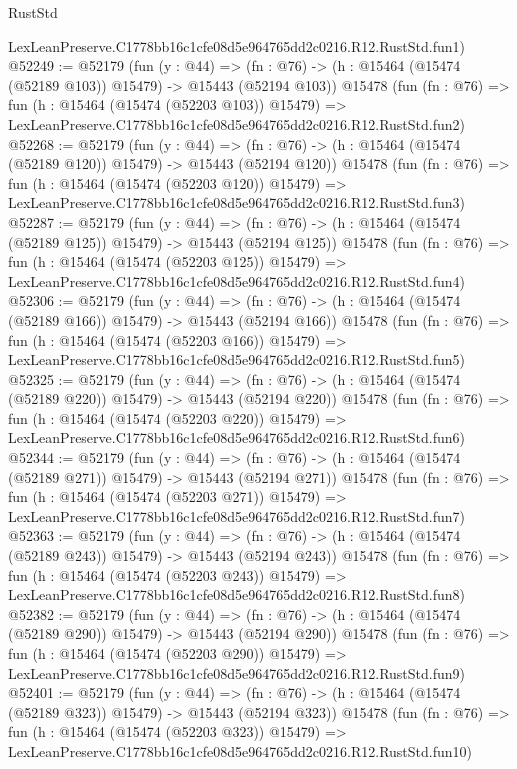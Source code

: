 \begin{lexlean}{RustStd}
\begin{coremodule}
    LexLeanPreserve.C1778bb16c1cfe08d5e964765dd2c0216.R12.RustStd.fun1)
@52249 := @52179
    (fun (y : @44) =>
    (fn : @76) -> (h : @15464 (@15474 (@52189 @103)) @15479) -> @15443 (@52194 @103))
    @15478
    (fun (fn : @76) =>
    fun (h : @15464 (@15474 (@52203 @103)) @15479) =>
    LexLeanPreserve.C1778bb16c1cfe08d5e964765dd2c0216.R12.RustStd.fun2)
@52268 := @52179
    (fun (y : @44) =>
    (fn : @76) -> (h : @15464 (@15474 (@52189 @120)) @15479) -> @15443 (@52194 @120))
    @15478
    (fun (fn : @76) =>
    fun (h : @15464 (@15474 (@52203 @120)) @15479) =>
    LexLeanPreserve.C1778bb16c1cfe08d5e964765dd2c0216.R12.RustStd.fun3)
@52287 := @52179
    (fun (y : @44) =>
    (fn : @76) -> (h : @15464 (@15474 (@52189 @125)) @15479) -> @15443 (@52194 @125))
    @15478
    (fun (fn : @76) =>
    fun (h : @15464 (@15474 (@52203 @125)) @15479) =>
    LexLeanPreserve.C1778bb16c1cfe08d5e964765dd2c0216.R12.RustStd.fun4)
@52306 := @52179
    (fun (y : @44) =>
    (fn : @76) -> (h : @15464 (@15474 (@52189 @166)) @15479) -> @15443 (@52194 @166))
    @15478
    (fun (fn : @76) =>
    fun (h : @15464 (@15474 (@52203 @166)) @15479) =>
    LexLeanPreserve.C1778bb16c1cfe08d5e964765dd2c0216.R12.RustStd.fun5)
@52325 := @52179
    (fun (y : @44) =>
    (fn : @76) -> (h : @15464 (@15474 (@52189 @220)) @15479) -> @15443 (@52194 @220))
    @15478
    (fun (fn : @76) =>
    fun (h : @15464 (@15474 (@52203 @220)) @15479) =>
    LexLeanPreserve.C1778bb16c1cfe08d5e964765dd2c0216.R12.RustStd.fun6)
@52344 := @52179
    (fun (y : @44) =>
    (fn : @76) -> (h : @15464 (@15474 (@52189 @271)) @15479) -> @15443 (@52194 @271))
    @15478
    (fun (fn : @76) =>
    fun (h : @15464 (@15474 (@52203 @271)) @15479) =>
    LexLeanPreserve.C1778bb16c1cfe08d5e964765dd2c0216.R12.RustStd.fun7)
@52363 := @52179
    (fun (y : @44) =>
    (fn : @76) -> (h : @15464 (@15474 (@52189 @243)) @15479) -> @15443 (@52194 @243))
    @15478
    (fun (fn : @76) =>
    fun (h : @15464 (@15474 (@52203 @243)) @15479) =>
    LexLeanPreserve.C1778bb16c1cfe08d5e964765dd2c0216.R12.RustStd.fun8)
@52382 := @52179
    (fun (y : @44) =>
    (fn : @76) -> (h : @15464 (@15474 (@52189 @290)) @15479) -> @15443 (@52194 @290))
    @15478
    (fun (fn : @76) =>
    fun (h : @15464 (@15474 (@52203 @290)) @15479) =>
    LexLeanPreserve.C1778bb16c1cfe08d5e964765dd2c0216.R12.RustStd.fun9)
@52401 := @52179
    (fun (y : @44) =>
    (fn : @76) -> (h : @15464 (@15474 (@52189 @323)) @15479) -> @15443 (@52194 @323))
    @15478
    (fun (fn : @76) =>
    fun (h : @15464 (@15474 (@52203 @323)) @15479) =>
    LexLeanPreserve.C1778bb16c1cfe08d5e964765dd2c0216.R12.RustStd.fun10)

\end{coremodule}
\end{lexlean}
